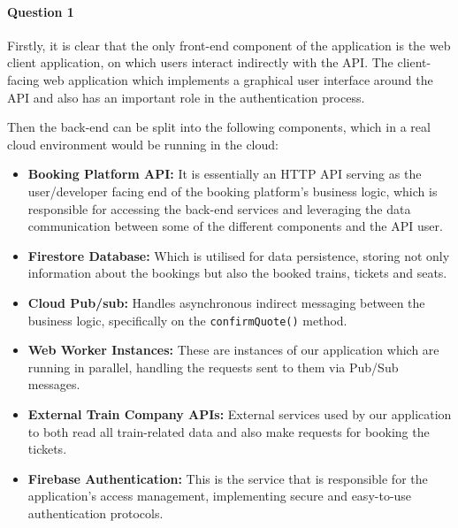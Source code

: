 \documentclass{ds-report}
\begin{document}
	\maketitle

	\paragraph{Question 1}

Firstly, it is clear that the only front-end component of the application is the web client application, on which users interact indirectly with the API. The client-facing web application which implements a graphical user interface around the API and also has an important role in the authentication process. 

Then the back-end can be split into the following components, which in a real cloud environment would be running in the cloud:

\begin{itemize}
    \item {\bf Booking Platform API:} It is essentially an HTTP API serving as the user/developer facing end of the booking platform's business logic, which is responsible for accessing the back-end services and leveraging the data communication between some of the different components and the API user.
    \item {\bf Firestore Database:} Which is utilised for data persistence, storing not only information about the bookings but also the booked trains, tickets and seats.
    \item {\bf Cloud Pub/sub:} Handles asynchronous indirect messaging between the business logic, specifically on the \texttt{confirmQuote()} method.
    \item {\bf Web Worker Instances:} These are instances of our application which are running in parallel, handling the requests sent to them via Pub/Sub messages.
    \item {\bf External Train Company APIs:} External services used by our application to both read all train-related data and also make requests for booking the tickets.
    \item {\bf Firebase Authentication:} This is the service that is responsible for the application's access management, implementing secure and easy-to-use authentication protocols.  
\end{itemize}
\end{document}
